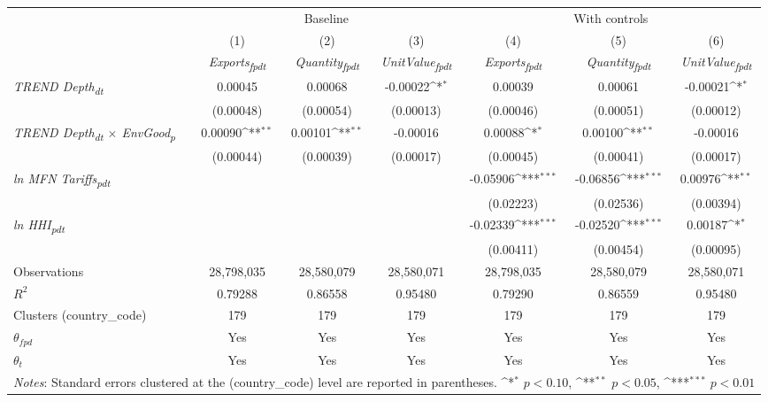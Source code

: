 {
\def\sym#1{\ifmmode^{#1}\else\(^{#1}\)\fi}
\begin{tabular}{l*{6}{c}}
\toprule
&\multicolumn{3}{c}{Baseline}&\multicolumn{3}{c}{With controls}\\\cmidrule(lr){2-4}\cmidrule(lr){5-7}
&(1)&(2)&(3)&(4)&(5)&(6)\\
&\textit{Exports\textsubscript{fpdt}}&\textit{Quantity\textsubscript{fpdt}}&\textit{UnitValue\textsubscript{fpdt}}&\textit{Exports\textsubscript{fpdt}}&\textit{Quantity\textsubscript{fpdt}}&\textit{UnitValue\textsubscript{fpdt}}\\
\midrule
\textit{TREND Depth\textsubscript{dt}} & 0.00045 & 0.00068 & -0.00022\sym{*} & 0.00039 & 0.00061 & -0.00021\sym{*}\\
 & (0.00048) & (0.00054) & (0.00013) & (0.00046) & (0.00051) & (0.00012)\\
\addlinespace
\textit{TREND Depth\textsubscript{dt} $\times$ EnvGood\textsubscript{p}} & 0.00090\sym{**} & 0.00101\sym{**} & -0.00016 & 0.00088\sym{*} & 0.00100\sym{**} & -0.00016\\
 & (0.00044) & (0.00039) & (0.00017) & (0.00045) & (0.00041) & (0.00017)\\
\addlinespace
\textit{ln MFN Tariffs\textsubscript{pdt}} &  &  &  & -0.05906\sym{***} & -0.06856\sym{***} & 0.00976\sym{**}\\
 &  &  &  & (0.02223) & (0.02536) & (0.00394)\\
\addlinespace
\textit{ln HHI\textsubscript{pdt}} &  &  &  & -0.02339\sym{***} & -0.02520\sym{***} & 0.00187\sym{*}\\
 &  &  &  & (0.00411) & (0.00454) & (0.00095)\\
\midrule
Observations & 28,798,035 & 28,580,079 & 28,580,071 & 28,798,035 & 28,580,079 & 28,580,071\\
$R^{2}$ & 0.79288 & 0.86558 & 0.95480 & 0.79290 & 0.86559 & 0.95480\\
Clusters (country_code) & 179 & 179 & 179 & 179 & 179 & 179\\
$\theta_{fpd}$ & Yes & Yes & Yes & Yes & Yes & Yes\\
$\theta_{t}$ & Yes & Yes & Yes & Yes & Yes & Yes\\
\bottomrule
\multicolumn{7}{l}{\footnotesize \textit{Notes}: Standard errors clustered at the (country_code) level are reported in parentheses. \sym{*} \(p<0.10\), \sym{**} \(p<0.05\), \sym{***} \(p<0.01\)}\\
\end{tabular}
}
